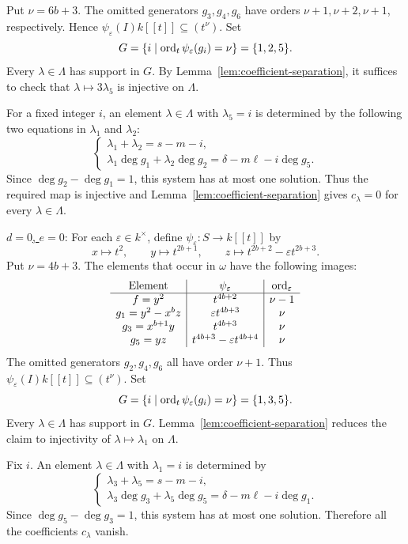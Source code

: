Put $\nu=6b+3$. The omitted generators $g_3,g_4,g_6$ have
orders $\nu+1,\nu+2,\nu+1$, respectively. Hence
$\psi_\varepsilon(I)k[[t]]\subseteq(t^\nu)$. Set
\[
 G=\{i\mid\operatorname{ord}_t\psi_\varepsilon(g_i)=\nu\}=\{1,2,5\}.
\]
Every $\lambda\in\Lambda$ has support in $G$.
By Lemma~\ref{lem:coefficient-separation}, it suffices to check that
$\lambda\mapsto3\lambda_5$ is injective on $\Lambda$.

For a fixed integer $i$, an element
$\lambda\in\Lambda$ with $\lambda_5=i$ is determined by the following two
equations in $\lambda_1$ and $\lambda_2$:
$$
\begin{cases}
	\lambda_1 + \lambda_2 = s-m-i, \\
	\lambda_1 \deg g_1 + \lambda_2 \deg g_2
	= \delta-m\ell-i\deg g_5.
\end{cases}
$$
Since $\deg g_2-\deg g_1=1$, this system has at most one
solution. Thus the required map is injective and
Lemma~\ref{lem:coefficient-separation} gives $c_\lambda=0$ for every
$\lambda\in\Lambda$.


\medskip

\noindent
\underline{$d=0$, $e=0$}: 
For each $\varepsilon\in k^\times$, define
$\psi_\varepsilon\colon S\to k[[t]]$ by
$$
x\longmapsto t^2,\qquad
y\longmapsto t^{2b+1},\qquad
z\longmapsto t^{2b+2}-\varepsilon t^{2b+3}.
$$
Put $\nu=4b+3$.  The elements that occur in $\omega$ have the following
images:
\[
\begin{array}{c|c|c}
 \text{Element}&\psi_\varepsilon&\operatorname{ord}_\varepsilon\\ \hline
 f=y^2&t^{4b+2}&\nu-1\\
 g_1=y^2-x^bz&\varepsilon t^{4b+3}&\nu\\
 g_3=x^{b+1}y&t^{4b+3}&\nu\\
 g_5=yz&t^{4b+3}-\varepsilon t^{4b+4}&\nu
\end{array}
\]
The omitted generators $g_2,g_4,g_6$ all have order $\nu+1$.
Thus $\psi_\varepsilon(I)k[[t]]\subseteq(t^\nu)$. Set
\[
 G=\{i\mid\operatorname{ord}_t\psi_\varepsilon(g_i)=\nu\}=\{1,3,5\}.
\]
Every $\lambda\in\Lambda$ has support in $G$. Lemma~\ref{lem:coefficient-separation} reduces the claim to
injectivity of $\lambda\mapsto\lambda_1$ on $\Lambda$.

Fix $i$.  An element $\lambda\in\Lambda$ with $\lambda_1=i$ is determined
by
$$
\begin{cases}
 \lambda_3+\lambda_5=s-m-i,\\
 \lambda_3\deg g_3+\lambda_5\deg g_5
 =\delta-m\ell-i\deg g_1.
\end{cases}
$$
Since $\deg g_5-\deg g_3=1$, this system has at most one solution.
Therefore all the coefficients $c_\lambda$ vanish.

